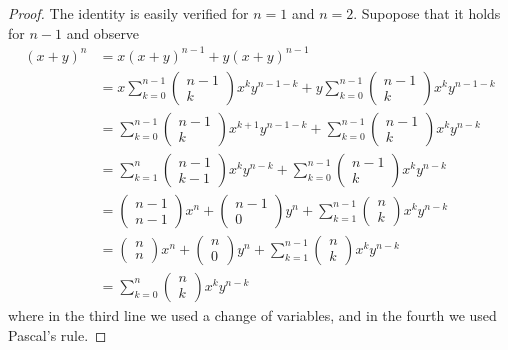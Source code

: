 \begin{proof}
The identity is easily verified for $n=1$ and $n=2$. Supopose that
it holds for $n-1$ and observe
\begin{align*}
\left(x+y\right)^{n} & =x\left(x+y\right)^{n-1}+y\left(x+y\right)^{n-1}\\
 & =x\sum_{k=0}^{n-1}\left(\begin{array}{c}
n-1\\
k
\end{array}\right)x^{k}y^{n-1-k}+y\sum_{k=0}^{n-1}\left(\begin{array}{c}
n-1\\
k
\end{array}\right)x^{k}y^{n-1-k}\\
 & =\sum_{k=0}^{n-1}\left(\begin{array}{c}
n-1\\
k
\end{array}\right)x^{k+1}y^{n-1-k}+\sum_{k=0}^{n-1}\left(\begin{array}{c}
n-1\\
k
\end{array}\right)x^{k}y^{n-k}\\
 & =\sum_{k=1}^{n}\left(\begin{array}{c}
n-1\\
k-1
\end{array}\right)x^{k}y^{n-k}+\sum_{k=0}^{n-1}\left(\begin{array}{c}
n-1\\
k
\end{array}\right)x^{k}y^{n-k}\\
 & =\left(\begin{array}{c}
n-1\\
n-1
\end{array}\right)x^{n}+\left(\begin{array}{c}
n-1\\
0
\end{array}\right)y^{n}+\sum_{k=1}^{n-1}\left(\begin{array}{c}
n\\
k
\end{array}\right)x^{k}y^{n-k}\\
 & =\left(\begin{array}{c}
n\\
n
\end{array}\right)x^{n}+\left(\begin{array}{c}
n\\
0
\end{array}\right)y^{n}+\sum_{k=1}^{n-1}\left(\begin{array}{c}
n\\
k
\end{array}\right)x^{k}y^{n-k}\\
 & =\sum_{k=0}^{n}\left(\begin{array}{c}
n\\
k
\end{array}\right)x^{k}y^{n-k}
\end{align*}
where in the third line we used a change of variables, and in the
fourth we used Pascal's rule.
\end{proof}
